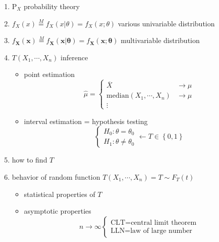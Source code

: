 \documentclass[
]{book}
\providecommand{\tightlist}{%
  \setlength{\itemsep}{0pt}\setlength{\parskip}{0pt}}
\theoremstyle{definition}
\theoremstyle{definition}
\theoremstyle{definition}
\theoremstyle{definition}
\theoremstyle{remark}
\begin{document}
\begin{enumerate}
\def\labelenumi{\arabic{enumi}.}
\tightlist
\item
  \(\mathrm{P}_{{\scriptscriptstyle X}}\) probability theory
\item
  \(f_{{\scriptscriptstyle X}}\left(x\right)\overset{M}{=}f_{{\scriptscriptstyle X}}\left(x|\theta\right)=f_{{\scriptscriptstyle X}}\left(x;\theta\right)\) various univariable distribution
\item
  \(f_{\boldsymbol{{\scriptscriptstyle X}}}\left(\boldsymbol{x}\right)\overset{M}{=}f_{\boldsymbol{{\scriptscriptstyle X}}}\left(\boldsymbol{x}|\boldsymbol{\theta}\right)=f_{\boldsymbol{{\scriptscriptstyle X}}}\left(\boldsymbol{x};\boldsymbol{\theta}\right)\) multivariable distribution
\item
  \(T\left(X_{{\scriptscriptstyle 1}},\cdots,X_{{\scriptscriptstyle n}}\right)\) inference

  \begin{itemize}
  \tightlist
  \item
    point estimation
    \[
      \widehat{\mu}=\begin{cases}
      \overline{X} & \rightarrow\mu\\
      \mathrm{median}\left(X_{{\scriptscriptstyle 1}},\cdots,X_{{\scriptscriptstyle n}}\right) & \rightarrow\mu\\
      \vdots
      \end{cases}
    \]
  \item
    interval estimation = hypothesis testing
    \[
      \begin{cases}
      H_{{\scriptscriptstyle 0}}:\theta=\theta_{{\scriptscriptstyle 0}}\\
      H_{{\scriptscriptstyle 1}}:\theta\ne\theta_{{\scriptscriptstyle 0}}
      \end{cases}\leftarrow T\in\left\{ 0,1\right\} 
    \]
  \end{itemize}
\item
  how to find \(T\)
\item
  behavior of random function \(T\left(X_{{\scriptscriptstyle 1}},\cdots,X_{{\scriptscriptstyle n}}\right)=T\sim F_{{\scriptscriptstyle T}}\left(t\right)\)

  \begin{itemize}
  \tightlist
  \item
    statistical properties of \(T\)
  \item
    asymptotic properties
    \[
      n\rightarrow\infty\begin{cases}
      \text{CLT}=\text{central limit theorem}\\
      \text{LLN}=\text{law of large number}
      \end{cases}
    \]
  \end{itemize}
\end{enumerate}
\end{document}
